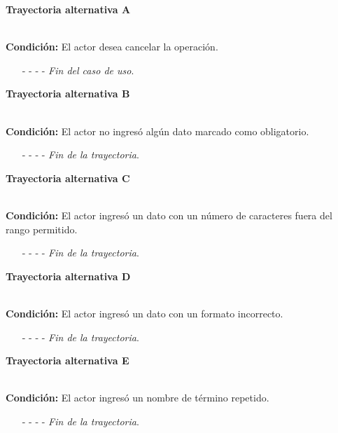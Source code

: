 	\hypertarget{CU6-1:TAA}{\textbf{Trayectoria alternativa A}}\\
	\noindent \textbf{Condición:} El actor desea cancelar la operación.
	\begin{enumerate}
		\UCpaso[\UCactor] Solicita cancelar la operación oprimiendo el botón  de la pantalla 
		\UCpaso[\UCsist] Muestra la pantalla .
		\item[- -] - - {\em {Fin del caso de uso}}.%
	\end{enumerate}
\hypertarget{CU6-1:TAB}{\textbf{Trayectoria alternativa B}}\\
\noindent \textbf{Condición:} El actor no ingresó algún dato marcado como obligatorio.
\begin{enumerate}
	\UCpaso[\UCsist] Muestra el mensaje  señalando el campo que presenta el error en la pantalla .
	\UCpaso Regresa al paso \ref{CU6.1-P3} de la trayectoria principal.
	\item[- -] - - {\em {Fin de la trayectoria}}.%
\end{enumerate}
\hypertarget{CU6-1:TAC}{\textbf{Trayectoria alternativa C}}\\
\noindent \textbf{Condición:} El actor ingresó un dato con un número de caracteres fuera del rango permitido.
\begin{enumerate}
	\UCpaso[\UCsist] Muestra el mensaje  señalando el campo que presenta el error en la pantalla .
	\UCpaso Regresa al paso \ref{CU6.1-P3} de la trayectoria principal.
	\item[- -] - - {\em {Fin de la trayectoria}}.%
\end{enumerate}
\hypertarget{CU6-1:TAD}{\textbf{Trayectoria alternativa D}}\\
\noindent \textbf{Condición:} El actor ingresó un dato con un formato incorrecto.
\begin{enumerate}
	\UCpaso[\UCsist] Muestra el mensaje  señalando el campo que presenta el error en la pantalla .
	\UCpaso Regresa al paso \ref{CU6.1-P3} de la trayectoria principal.
	\item[- -] - - {\em {Fin de la trayectoria}}.
\end{enumerate}
\hypertarget{CU6-1:TAE}{\textbf{Trayectoria alternativa E}}\\
\noindent \textbf{Condición:} El actor ingresó un nombre de término repetido.
\begin{enumerate}
	\UCpaso[\UCsist] Muestra el mensaje  señalando el campo que presenta la duplicidad en la pantalla .
	\UCpaso Regresa al paso \ref{CU6.1-P3} de la trayectoria principal.
	\item[- -] - - {\em {Fin de la trayectoria}}.
\end{enumerate}



